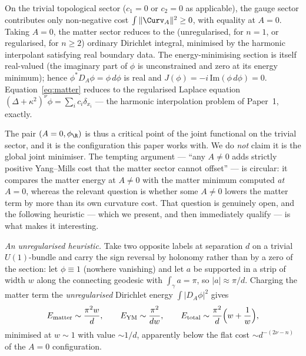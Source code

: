 On the trivial topological sector ($c_1=0$ or $c_2=0$ as
applicable), the gauge sector contributes only non-negative cost
$\int\|\Curv_A\|^2\geq 0$, with equality at $A=0$. Taking $A=0$, the
matter sector reduces to the (unregularised, for $n=1$, or
regularised, for $n\geq 2$) ordinary Dirichlet integral, minimised
by the harmonic interpolant satisfying real boundary data. The
energy-minimising section is itself real-valued (the imaginary part
of $\phi$ is unconstrained and zero at its energy minimum); hence
$\phi^*D_A\phi=\phi\,d\phi$ is real and
$J(\phi)=-i\,\mathrm{Im}(\phi\,d\phi)=0$. Equation~\eqref{eq:matter}
reduces to the regularised Laplace equation
$(\Delta+\kappa^2)^\nu\phi=\sum_i c_i\delta_{x_i}$ --- the harmonic
interpolation problem of Paper~1, exactly.

The pair $(A=0,\phi_{\R})$ is thus a critical point of the joint
functional on the trivial sector, and it is the configuration this
paper works with. We do \emph{not} claim it is the global joint
minimiser. The tempting argument --- ``any $A\neq 0$ adds strictly
positive Yang--Mills cost that the matter sector cannot offset'' ---
is circular: it compares the matter energy at $A\neq 0$ with the
matter minimum computed \emph{at} $A=0$, whereas the relevant
question is whether some $A\neq 0$ lowers the matter term by more
than its own curvature cost. That question is genuinely open, and
the following heuristic --- which we present, and then immediately
qualify --- is what makes it interesting.

\emph{An unregularised heuristic.} Take two opposite labels at
separation $d$ on a trivial $U(1)$-bundle and carry the sign
reversal by holonomy rather than by a zero of the section: let
$\phi\equiv 1$ (nowhere vanishing) and let $a$ be supported in a
strip of width $w$ along the connecting geodesic with
$\int_\gamma a=\pi$, so $|a|\approx\pi/d$. Charging the matter term
the \emph{unregularised} Dirichlet energy $\int|D_A\phi|^2$ gives
\[
   E_{\text{matter}}\sim\frac{\pi^2 w}{d},\qquad
   E_{\mathrm{YM}}\sim\frac{\pi^2}{dw},\qquad
   E_{\text{total}}\sim\frac{\pi^2}{d}\Bigl(w+\frac1w\Bigr),
\]
minimised at $w\sim 1$ with value $\sim 1/d$, apparently below the
flat cost $\sim d^{-(2\nu-n)}$ of the $A=0$ configuration.

